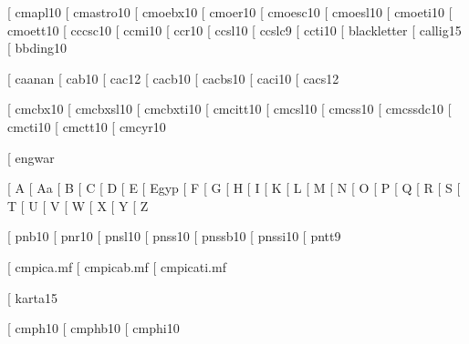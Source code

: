 
\makeatletter

\def\font@sample[#1]#2{%
  \font\foo=#2 #1\relax
  \openin0=#2\relax
  \ifeof0 #2: Generate a table!\par
  \else 
  \fi
  \closein0
}

\def\@font@sample#1{\font@sample[]{#1}}

\def\fontsample{\@ifnextchar [{\font@sample}{\@font@sample}%
  }

\makeatother



\fontsample{cmapl10}
\fontsample{cmastro10}
\fontsample{cmoebx10}
\fontsample{cmoer10}
\fontsample{cmoesc10}
\fontsample{cmoesl10}
\fontsample{cmoeti10}
\fontsample{cmoett10}
\fontsample{cccsc10}
\fontsample{ccmi10}
\fontsample{ccr10}
\fontsample{ccsl10}
\fontsample{ccslc9}
\fontsample{ccti10}
\fontsample{blackletter}
\fontsample{callig15}
\fontsample{bbding10}

\fontsample{caanan}
\fontsample{cab10}
\fontsample{cac12}
\fontsample{cacb10}
\fontsample{cacbs10}
\fontsample{caci10}
\fontsample{cacs12}

\fontsample{cmcbx10}
\fontsample{cmcbxsl10}
\fontsample{cmcbxti10}
\fontsample{cmcitt10}
\fontsample{cmcsl10}
\fontsample{cmcss10}
\fontsample{cmcssdc10}
\fontsample{cmcti10}
\fontsample{cmctt10}
\fontsample{cmcyr10}

\fontsample{engwar}

\fontsample{A}
\fontsample{Aa}
\fontsample{B}
\fontsample{C}
\fontsample{D}
\fontsample{E}
\fontsample{Egyp}
\fontsample{F}
\fontsample{G}
\fontsample{H}
\fontsample{I}
\fontsample{K}
\fontsample{L}
\fontsample{M}
\fontsample{N}
\fontsample{O}
\fontsample{P}
\fontsample{Q}
\fontsample{R}
\fontsample{S}
\fontsample{T}
\fontsample{U}
\fontsample{V}
\fontsample{W}
\fontsample{X}
\fontsample{Y}
\fontsample{Z}

\fontsample{pnb10}
\fontsample{pnr10}
\fontsample{pnsl10}
\fontsample{pnss10}
\fontsample{pnssb10}
\fontsample{pnssi10}
\fontsample{pntt9}

\fontsample{cmpica.mf}
\fontsample{cmpicab.mf}
\fontsample{cmpicati.mf}

\fontsample{karta15}

\fontsample{cmph10}
\fontsample{cmphb10}
\fontsample{cmphi10}





